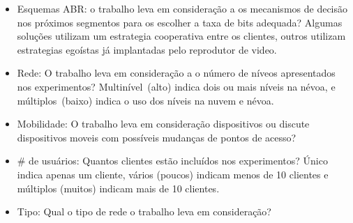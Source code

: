 \begin{itemize}

\item Esquemas ABR: o trabalho leva em consideração a os mecanismos de decisão nos próximos segmentos para os escolher a taxa de bits adequada? Algumas soluções utilizam um estrategia cooperativa entre os clientes, outros utilizam estrategias egoístas já implantadas pelo reprodutor de video.

\item Rede: O trabalho leva em consideração a o número de níveos apresentados nos experimentos? Multinível~(alto) indica dois ou mais níveis na névoa, e múltiplos~(baixo) indica o uso dos níveis na nuvem e névoa.

\item Mobilidade: O trabalho leva em consideração dispositivos ou discute dispositivos moveis com possíveis mudanças de pontos de acesso?

\item \# de usuários: Quantos clientes estão incluídos nos experimentos? Único indica apenas um cliente, vários (poucos) indicam menos de 10 clientes e múltiplos (muitos) indicam mais de 10 clientes.

\item Tipo: Qual o tipo de rede o trabalho leva em consideração?

\end{itemize}

